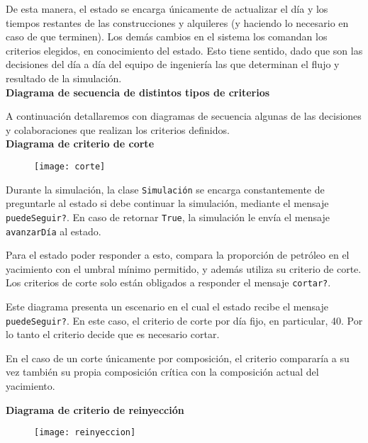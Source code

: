 De esta manera, el estado se encarga únicamente de actualizar el día y los tiempos restantes de las construcciones y alquileres (y haciendo lo necesario en caso de que terminen). Los demás cambios en el sistema los comandan los criterios elegidos, en conocimiento del estado. Esto tiene sentido, dado que son las decisiones del día a día del equipo de ingeniería las que determinan el flujo y resultado de la simulación.
\\

\newpage
\textbf{Diagrama de secuencia de distintos tipos de criterios}

A continuación detallaremos con diagramas de secuencia algunas de las decisiones y colaboraciones que realizan los criterios definidos.
\\

\textbf{Diagrama de criterio de corte}
\begin{figure}[H]
\centering
\texttt{[image: corte]}
\end{figure}

Durante la simulación, la clase \texttt{Simulación} se encarga constantemente 
de preguntarle al estado si debe continuar la simulación, mediante el mensaje 
\texttt{puedeSeguir?}. En caso de retornar \texttt{True}, la simulación 
le envía el mensaje \texttt{avanzarDía} al estado. 

Para el estado poder responder a esto, compara la proporción de petróleo en el 
yacimiento con el umbral mínimo permitido, y además utiliza su criterio de corte. 
Los criterios de corte solo están obligados a responder el 
mensaje \texttt{cortar?}. 

Este diagrama presenta un escenario en el cual el estado recibe el mensaje \texttt{puedeSeguir?}. En este caso, el criterio de corte por día fijo, en particular, 40. Por lo tanto el criterio decide que es necesario cortar. 

En el caso de un corte únicamente por composición, el criterio compararía a su vez también su propia composición crítica con la composición actual del yacimiento.


\newpage
\textbf{Diagrama de criterio de reinyección}
\begin{figure}[H]
\centering
\texttt{[image: reinyeccion]}
\end{figure}

